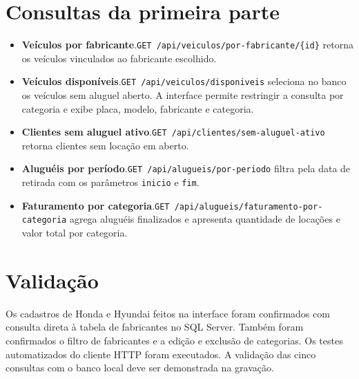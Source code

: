 \documentclass[12pt]{article}
\begin{document}
\section{Consultas da primeira parte}
\begin{itemize}
\item \textbf{Veículos por fabricante}.\newline \nolinkurl{GET /api/veiculos/por-fabricante/{id}} retorna os veículos vinculados ao fabricante escolhido.
\item \textbf{Veículos disponíveis}.\newline \nolinkurl{GET /api/veiculos/disponiveis} seleciona no banco os veículos sem aluguel aberto. A interface permite restringir a consulta por categoria e exibe placa, modelo, fabricante e categoria.
\item \textbf{Clientes sem aluguel ativo}.\newline \nolinkurl{GET /api/clientes/sem-aluguel-ativo} retorna clientes sem locação em aberto.
\item \textbf{Aluguéis por período}.\newline \nolinkurl{GET /api/alugueis/por-periodo} filtra pela data de retirada com os parâmetros \texttt{inicio} e \texttt{fim}.
\item \textbf{Faturamento por categoria}.\newline \nolinkurl{GET /api/alugueis/faturamento-por-categoria} agrega aluguéis finalizados e apresenta quantidade de locações e valor total por categoria.
\end{itemize}

\section{Validação}
Os cadastros de Honda e Hyundai feitos na interface foram confirmados com consulta direta à tabela de fabricantes no SQL Server. Também foram confirmados o filtro de fabricantes e a edição e exclusão de categorias. Os testes automatizados do cliente HTTP foram executados. A validação das cinco consultas com o banco local deve ser demonstrada na gravação.
\end{document}
